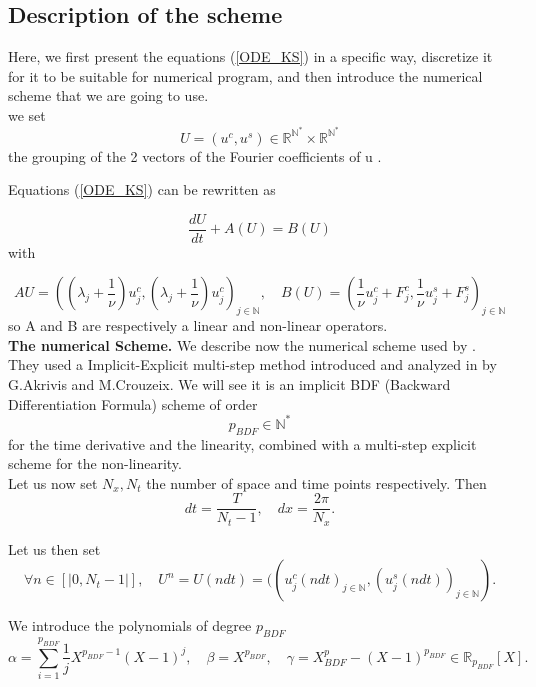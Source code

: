 \documentclass[12pt]{article}
\begin{document}
\subsection{Description of the scheme}

Here, we first present the equations (\ref{ODE_KS}) in a specific way, discretize it for it to be suitable for numerical program, and then introduce the numerical scheme that we are going to use. 
\\

we set 
\begin{equation}
    U = (u^c, u^s) \in \mathbb{R}^{\mathbb{N}^*} \times\mathbb{R}^{\mathbb{N}^*}
\end{equation} the grouping of the 2 vectors of the Fourier coefficients of u .

Equations (\ref{ODE_KS}) can be rewritten as 

\begin{equation}
    \frac{dU}{dt} + A(U) = B(U)
\end{equation}
with 

$$AU = \left((\lambda_j + \frac{1}{\nu})u^c_j, (\lambda_j + \frac{1}{\nu})u^c_j\right)_{j \in \mathbb{N}}, \quad B(U) = \left(\frac{1}{\nu}u_j^c + F_j^c, \frac{1}{\nu}u_j^s + F_j^s\right)_{j\in \mathbb{N}}$$
so A and B are respectively a linear and non-linear operators.
\\

\textbf{The numerical Scheme.} We describe now the numerical scheme used by \cite{Scheme_for_KS}. They used a Implicit-Explicit multi-step method introduced and analyzed in \cite{KS_scheme_C_A} by G.Akrivis and M.Crouzeix. We will see it is an implicit BDF (Backward Differentiation Formula) scheme of order 
\begin{equation}
    p_{BDF} \in \mathbb{N}^*
\end{equation} for the time derivative and the linearity, combined with a multi-step explicit scheme for the non-linearity. 
\\

Let us now set $N_x, N_t$ the number of space and time points respectively. Then $$dt = \frac{T}{N_t-1},\quad dx = \frac{2\pi}{N_x}.$$ 

Let us then set $$\forall n\in [|0, N_t-1|], \quad U^n = U(ndt) = ((u_j^c(ndt)_{j\in \mathbb{N}}, (u_j^s(ndt))_{j\in \mathbb{N}}).$$

We introduce the polynomials of degree $p_{BDF}$
 \begin{equation}
     \alpha = \sum_{i=1}^{p_{BDF}} \frac{1}{j}X^{p_{BDF}-1}(X-1)^j, \quad  \beta = X^{p_{BDF}}, \quad \gamma = X^p_{BDF} - (X-1)^{p_{BDF}} \in \mathbb{R}_{p_{BDF}}[X].
 \end{equation}
\end{document}
